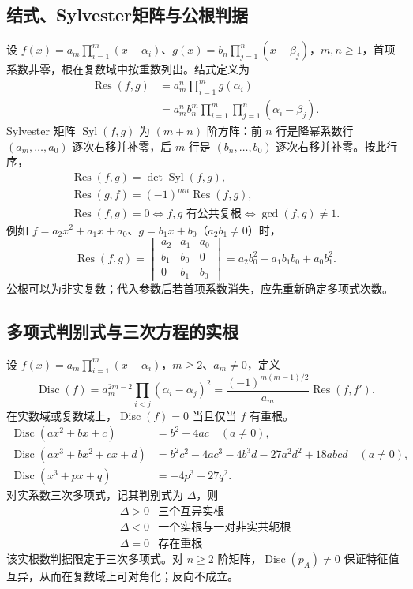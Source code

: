 \documentclass[../main.tex]{subfiles}
\begin{document}
\subsection{结式、Sylvester矩阵与公根判据}
设 $f(x)=a_m\prod_{i=1}^m(x-\alpha_i)$、$g(x)=b_n\prod_{j=1}^n(x-\beta_j)$，$m,n\ge1$，首项系数非零，根在复数域中按重数列出。结式定义为
\begin{align*}
\operatorname{Res}(f,g)
&=a_m^n\prod_{i=1}^m g(\alpha_i)\\
&=a_m^n b_n^m\prod_{i=1}^m\prod_{j=1}^n(\alpha_i-\beta_j).
\end{align*}
Sylvester 矩阵 $\operatorname{Syl}(f,g)$ 为 $(m+n)$ 阶方阵：前 $n$ 行是降幂系数行 $(a_m,\ldots,a_0)$ 逐次右移并补零，后 $m$ 行是 $(b_n,\ldots,b_0)$ 逐次右移并补零。按此行序，
\begin{gather*}
\operatorname{Res}(f,g)=\det\operatorname{Syl}(f,g),\\
\operatorname{Res}(g,f)=(-1)^{mn}\operatorname{Res}(f,g),\\
\operatorname{Res}(f,g)=0\iff f,g\text{ 有公共复根}
\iff\gcd(f,g)\ne1.
\end{gather*}
例如 $f=a_2x^2+a_1x+a_0$、$g=b_1x+b_0$（$a_2b_1\ne0$）时，
\[
\operatorname{Res}(f,g)=
\begin{vmatrix}a_2&a_1&a_0\\b_1&b_0&0\\0&b_1&b_0\end{vmatrix}
=a_2b_0^2-a_1b_1b_0+a_0b_1^2.
\]
公根可以为非实复数；代入参数后若首项系数消失，应先重新确定多项式次数。
\subsection{多项式判别式与三次方程的实根}
设 $f(x)=a_m\prod_{i=1}^m(x-\alpha_i)$，$m\ge2$、$a_m\ne0$，定义
\[
\operatorname{Disc}(f)=a_m^{2m-2}\prod_{i<j}(\alpha_i-\alpha_j)^2
=\frac{(-1)^{m(m-1)/2}}{a_m}\operatorname{Res}(f,f').
\]
在实数域或复数域上，$\operatorname{Disc}(f)=0$ 当且仅当 $f$ 有重根。
\begin{align*}
\operatorname{Disc}(ax^2+bx+c)&=b^2-4ac\quad(a\ne0),\\
\operatorname{Disc}(ax^3+bx^2+cx+d)
&=b^2c^2-4ac^3-4b^3d-27a^2d^2+18abcd\quad(a\ne0),\\
\operatorname{Disc}(x^3+px+q)&=-4p^3-27q^2.
\end{align*}
对实系数三次多项式，记其判别式为 $\Delta$，则
\[
\begin{array}{c|c}
\Delta>0&\text{三个互异实根}\\
\Delta<0&\text{一个实根与一对非实共轭根}\\
\Delta=0&\text{存在重根}
\end{array}
\]
该实根数判据限定于三次多项式。对 $n\ge2$ 阶矩阵，$\operatorname{Disc}(p_A)\ne0$ 保证特征值互异，从而在复数域上可对角化；反向不成立。
\end{document}
